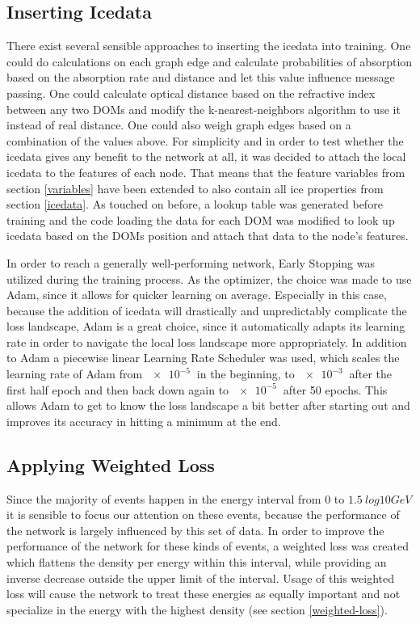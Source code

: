 \documentclass[a4paper,10pt]{scrartcl}
\begin{document}
\subsection{Inserting Icedata}

There exist several sensible approaches to inserting the icedata into training.
One could do calculations on each graph edge and calculate probabilities of absorption based on the absorption rate and distance and let this value influence message passing.
One could calculate optical distance based on the refractive index between any two DOMs and modify the k-nearest-neighbors algorithm to use it instead of real distance.
One could also weigh graph edges based on a combination of the values above.
For simplicity and in order to test whether the icedata gives any benefit to the network at all, it was decided to attach the local icedata to the features of each node.
That means that the feature variables from section \ref{variables} have been extended to also contain all ice properties from section \ref{icedata}.
As touched on before, a lookup table was generated before training and the code loading the data for each DOM was modified to look up icedata based on the DOMs position and attach that data to the node's features.

In order to reach a generally well-performing network, Early Stopping was utilized during the training process.
As the optimizer, the choice was made to use Adam, since it allows for quicker learning on average.
Especially in this case, because the addition of icedata will drastically and unpredictably complicate the loss landscape, Adam is a great choice, since it automatically adapts its learning rate in order to navigate the local loss landscape more appropriately.
In addition to Adam a piecewise linear Learning Rate Scheduler was used, which scales the learning rate of Adam from $\SI{e-5}{}$ in the beginning, to $\SI{e-3}{}$ after the first half epoch and then back down again to $\SI{e-5}{}$ after 50 epochs.
This allows Adam to get to know the loss landscape a bit better after starting out and improves its accuracy in hitting a minimum at the end.

\subsection{Applying Weighted Loss}

Since the majority of events happen in the energy interval from $0$ to $\SI{1.5}{log10 GeV}$ it is sensible to focus our attention on these events, because the performance of the network is largely influenced by this set of data.
In order to improve the performance of the network for these kinds of events, a weighted loss was created which flattens the density per energy within this interval, while providing an inverse decrease outside the upper limit of the interval.
Usage of this weighted loss will cause the network to treat these energies as equally important and not specialize in the energy with the highest density (see section \ref{weighted-loss}).
\end{document}
